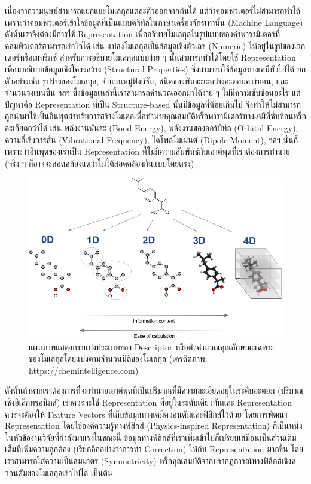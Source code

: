 เนื่องจากว่ามนุษย์สามารถแยกแยะโมเลกุลแต่ละตัวออกจากกันได้ แต่ว่าคอมพิวเตอร์ไม่สามารถทำได้เพราะว่าคอมพิวเตอร์เข้าใจข้อมูลที่เป็นแบบดิจิทัลในภาษาเครื่องจักรเท่านั้น (Machine Language) ดังนั้นเราจึงต้องมีการใช้ Representation เพื่ออธิบายโมเลกุลในรูปแบบของค่าพารามิเตอร์ที่คอมพิวเตอร์สามารถเข้าใจได้ เช่น แปลงโมเลกุลเป็นข้อมูลเชิงตัวเลข (Numeric) ให้อยู่ในรูปของเวกเตอร์หรือเมทริกซ์ สำหรับการอธิบายโมเลกุลแบบง่าย ๆ นั้นสามารถทำได้โดยใช้ Representation เพื่อมาอธิบายข้อมูลเชิงโครงสร้าง (Structural Properties) ซึ่งสามารถใช้ข้อมูลทางเคมีทั่วไปได้ ยกตัวอย่างเช่น รูปร่างของโมเลกุล, จำนวนหมู่ฟังก์ชัน, ชนิดของพันธะระหว่างอะตอมคาร์บอน, และจำนวนวงเบนซีน ฯลฯ ซึ่งข้อมูลเหล่านี้เราสามารถคำนวณออกมาได้ง่าย ๆ ไม่มีความซับซ้อนอะไร แต่ปัญหาคือ Representation ที่เป็น Structure-based นั้นมีข้อมูลที่น้อยเกินไป จึงทำให้ไม่สามารถถูกนำมาใช้เป็นอินพุตสำหรับการสร้างโมเดลเพื่อทำนายคุณสมบัติหรือพารามิเตอร์ทางเคมีที่ซับซ้อนหรือละเอียดกว่าได้ เช่น พลังงานพันธะ (Bond Energy), พลังงานของออร์บิทัล (Orbital Energy), ความถี่เชิงการสั่น (Vibrational Frequency), ไดโพลโมเมนต์ (Dipole Moment), ฯลฯ นั่นก็เพราะว่าอินพุตของเราเป็น Representation ที่ไม่มีความสัมพันธ์กับเอาต์พุตที่เราต้องการทำนาย (จริง ๆ ก็อาจจะสอดคล้องแต่ว่าไม่ได้สอดคล้องกันแบบโดยตรง)

\begin{figure}[H]
    \centering
    \includegraphics[width=\linewidth]{fig/descriptor_classes.png}
    \caption{แผนภาพแสดงการแบ่งประเภทของ Descriptor หรือตัวคำนวณคุณลักษณะเฉพาะของโมเลกุลโดยแบ่งตามจำนวนมิติของโมเลกุล (เครดิตภาพ: https://chemintelligence.com)}
    \label{fig:descriptor_classes}
\end{figure}

ดังนั้นถ้าหากเราต้องการที่จะทำนายเอาต์พุตที่เป็นปริมาณที่มีความละเอียดอยู่ในระดับอะตอม (ปริมาณเชิงอิเล็กทรอนิกส์) เราควรจะใช้ Representation ที่อยู่ในระดับเดียวกันและ Representation ควรจะต้องให้ Feature Vectors ที่เก็บข้อมูลทางเคมีควอนตัมและฟิสิกส์ไว้ด้วย โดยการพัฒนา Representation โดยใช้องค์ความรู้ทางฟิสิกส์ (Physics-inspired Representation) ก็เป็นหนึ่งในหัวข้องานวิจัยที่กำลังมาแรงในขณะนี้ ข้อมูลทางฟิสิกส์ที่เราเพิ่มเข้าไปก็เปรียบเสมือนเป็นส่วนเติมเต็มที่เพิ่มความถูกต้อง (เรียกอีกอย่างว่าการทำ Correction) ให้กับ Representation มากขึ้น โดยเราสามารถใส่ความเป็นสมมาตร (Symmetricity) หรือคุณสมบัติจากปรากฎการณ์ทางฟิสิกส์เชิงควอนตัมของโมเลกุลเข้าไปได้ เป็นต้น

